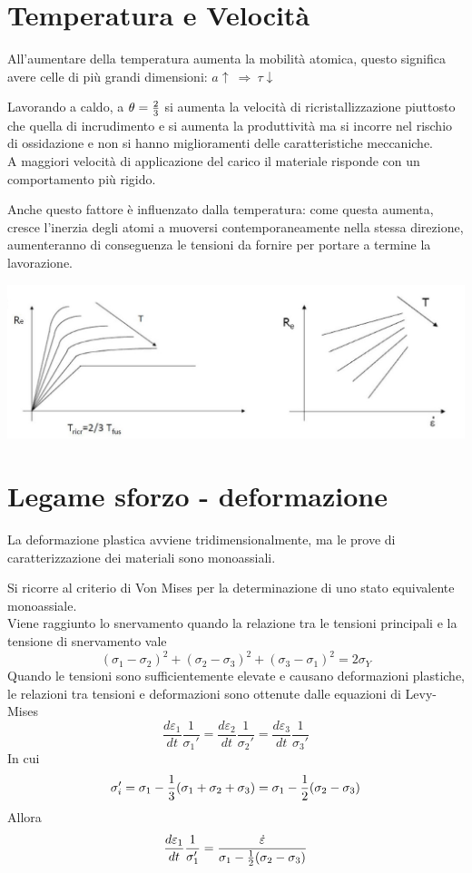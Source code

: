 \documentclass[a4paper, 15pt]{article}
\begin{document}
	\section{Temperatura e Velocità}
	All'aumentare della temperatura aumenta la mobilità atomica, questo significa avere celle di più grandi dimensioni: $a\uparrow~\Rightarrow~\tau\downarrow$
	
	Lavorando a caldo, a $\theta= {2\over3}$ si aumenta la velocità di ricristallizzazione piuttosto che quella di incrudimento e si aumenta la produttività ma si incorre nel rischio di ossidazione e non si hanno miglioramenti delle caratteristiche meccaniche.\\
	
	A maggiori velocità di applicazione del carico il materiale risponde con un comportamento più rigido. 
	
	Anche questo fattore è influenzato dalla temperatura: come questa aumenta, cresce l'inerzia degli atomi a muoversi contemporaneamente nella stessa direzione, aumenteranno di conseguenza le tensioni da fornire per portare a termine la lavorazione. 	
\begin{center}
	\includegraphics[width=0.8\linewidth]{figures/def2}
\end{center}
	 \section{Legame sforzo - deformazione}
	 La deformazione plastica avviene tridimensionalmente, ma le prove di caratterizzazione dei materiali sono monoassiali. 
	 
	 Si ricorre al criterio di Von Mises per la determinazione di uno stato equivalente monoassiale. \\
	 
	 Viene raggiunto lo snervamento quando la relazione tra le tensioni principali e la tensione di snervamento vale
	 \[(\sigma_1-\sigma_2)^2+(\sigma_2-\sigma_3)^2+(\sigma_3-\sigma_1)^2 = 2\sigma_Y\]
	 Quando le tensioni sono sufficientemente elevate e causano deformazioni plastiche, le relazioni tra tensioni e deformazioni sono ottenute dalle equazioni di Levy-Mises
	 \[\dfrac{d\varepsilon_1}{dt}\dfrac{1}{\sigma_1'} = \dfrac{d\varepsilon_2}{dt}\dfrac{1}{\sigma_2'} = \dfrac{d\varepsilon_3}{dt}\dfrac{1}{\sigma_3'}\]
	 In cui 
	 \[\sigma_i'= \sigma_1 - {1\over3}(\sigma_1+\sigma_2+\sigma_3) = \sigma_1 - {1\over2}(\sigma_2-\sigma_3)\]
	 Allora 
	 \[\dfrac{d\varepsilon_1}{dt}\dfrac{1}{\sigma_1'} = \dfrac{\dot{\varepsilon}}{\sigma_1 - {1\over2}(\sigma_2-\sigma_3)}\]
	 
\end{document}
